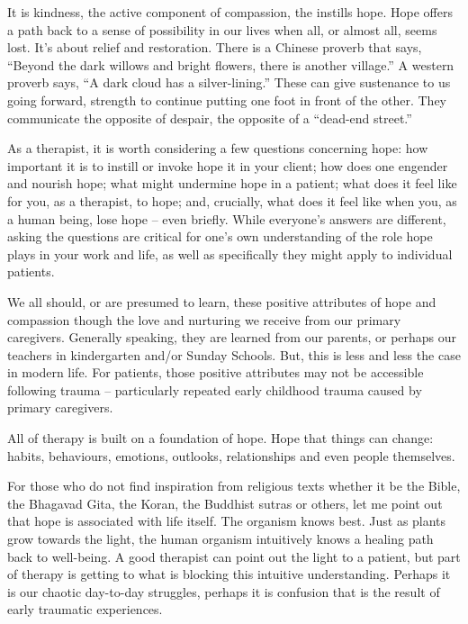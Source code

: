 \documentclass[]{book}
\begin{document}
It is kindness, the active component of compassion, the instills hope. Hope offers a path back to a sense of possibility in our lives when all, or almost all, seems lost. It's about relief and restoration. There is a Chinese proverb that says, ``Beyond the dark willows and bright flowers, there is another village.'' A western proverb says, ``A dark cloud has a silver-lining.'' These can give sustenance to us going forward, strength to continue putting one foot in front of the other. They communicate the opposite of despair, the opposite of a ``dead-end street.''

As a therapist, it is worth considering a few questions concerning hope: how important it is to instill or invoke hope it in your client; how does one engender and nourish hope; what might undermine hope in a patient; what does it feel like for you, as a therapist, to hope; and, crucially, what does it feel like when you, as a human being, lose hope -- even briefly. While everyone's answers are different, asking the questions are critical for one's own understanding of the role hope plays in your work and life, as well as specifically they might apply to individual patients.

We all should, or are presumed to learn, these positive attributes of hope and compassion though the love and nurturing we receive from our primary caregivers. Generally speaking, they are learned from our parents, or perhaps our teachers in kindergarten and/or Sunday Schools. But, this is less and less the case in modern life. For patients, those positive attributes may not be accessible following trauma -- particularly repeated early childhood trauma caused by primary caregivers.

All of therapy is built on a foundation of hope. Hope that things can change: habits, behaviours, emotions, outlooks, relationships and even people themselves.

For those who do not find inspiration from religious texts whether it be the Bible, the Bhagavad Gita, the Koran, the Buddhist sutras or others, let me point out that hope is associated with life itself. The organism knows best. Just as plants grow towards the light, the human organism intuitively knows a healing path back to well-being. A good therapist can point out the light to a patient, but part of therapy is getting to what is blocking this intuitive understanding. Perhaps it is our chaotic day-to-day struggles, perhaps it is confusion that is the result of early traumatic experiences.
\end{document}
